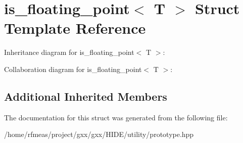 \hypertarget{structis__floating__point}{}\section{is\+\_\+floating\+\_\+point$<$ T $>$ Struct Template Reference}
\label{structis__floating__point}


Inheritance diagram for is\+\_\+floating\+\_\+point$<$ T $>$\+:


Collaboration diagram for is\+\_\+floating\+\_\+point$<$ T $>$\+:
\subsection*{Additional Inherited Members}


The documentation for this struct was generated from the following file\+:\begin{DoxyCompactItemize}
\item 
/home/rfmeas/project/gxx/gxx/\+H\+I\+D\+E/utility/prototype.\+hpp\end{DoxyCompactItemize}
